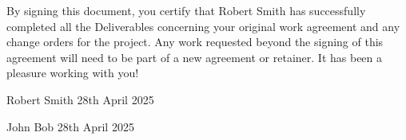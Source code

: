 \documentclass{article}
\begin{document}
By signing this document, you certify that Robert Smith has successfully completed all the Deliverables concerning your original work agreement and any change orders for the project. Any work requested beyond the signing of this agreement will need to be part of a new agreement or retainer. 
It has been a pleasure working with you!

\bigskip


Robert Smith
28th April 2025
\bigskip
\bigskip
\bigskip


John Bob
28th April 2025
\end{document}
